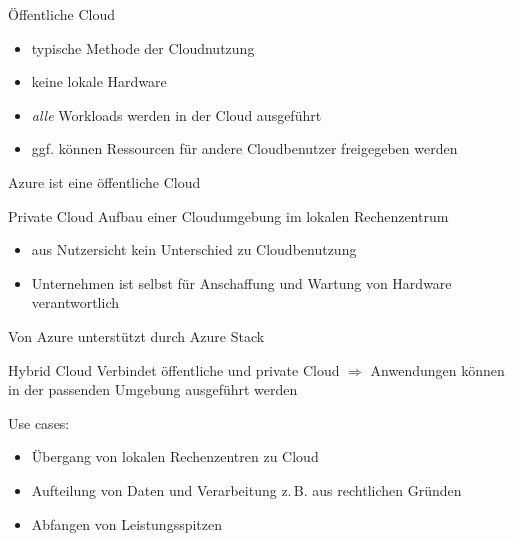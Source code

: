 
\begin{flashcard}[Describe]{Öffentliche Cloud}
    \begin{itemize}
        \item typische Methode der Cloudnutzung
        \item keine lokale Hardware
        \item \emph{alle} Workloads werden in der Cloud ausgeführt
        \item ggf. können Ressourcen für andere Cloudbenutzer freigegeben werden
    \end{itemize}

    \vspace{5mm}
    Azure ist eine öffentliche Cloud
\end{flashcard}

\begin{flashcard}[Describe]{Private Cloud}
    Aufbau einer Cloudumgebung im lokalen Rechenzentrum

    \begin{itemize}
        \item aus Nutzersicht kein Unterschied zu Cloudbenutzung
        \item Unternehmen ist selbst für Anschaffung und Wartung von Hardware verantwortlich
    \end{itemize}

    \vspace{5mm}
    Von Azure unterstützt durch Azure Stack

\end{flashcard}

\begin{flashcard}[Describe]{Hybrid Cloud}
    Verbindet öffentliche und private Cloud\newline
    $\Rightarrow$ Anwendungen können in der passenden Umgebung ausgeführt werden

    \vspace{5mm}
    Use cases:
    \begin{itemize}
        \item Übergang von lokalen Rechenzentren zu Cloud
        \item Aufteilung von Daten und Verarbeitung z.\,B. aus rechtlichen Gründen
        \item Abfangen von Leistungsspitzen
    \end{itemize}

\end{flashcard}

